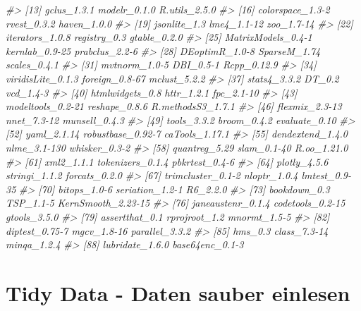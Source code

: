 \documentclass[12pt,]{book}
\newenvironment{Shaded}{\begin{snugshade}}{\end{snugshade}}
\newcommand{\CommentTok}[1]{\textcolor[rgb]{0.56,0.35,0.01}{\textit{{#1}}}}
\begin{document}
\begin{Shaded}
\begin{Highlighting}[]
\CommentTok{#> [13] gclus_1.3.1         modelr_0.1.0        R.utils_2.5.0      }
\CommentTok{#> [16] colorspace_1.3-2    rvest_0.3.2         haven_1.0.0        }
\CommentTok{#> [19] jsonlite_1.3        lme4_1.1-12         zoo_1.7-14         }
\CommentTok{#> [22] iterators_1.0.8     registry_0.3        gtable_0.2.0       }
\CommentTok{#> [25] MatrixModels_0.4-1  kernlab_0.9-25      prabclus_2.2-6     }
\CommentTok{#> [28] DEoptimR_1.0-8      SparseM_1.74        scales_0.4.1       }
\CommentTok{#> [31] mvtnorm_1.0-5       DBI_0.5-1           Rcpp_0.12.9        }
\CommentTok{#> [34] viridisLite_0.1.3   foreign_0.8-67      mclust_5.2.2       }
\CommentTok{#> [37] stats4_3.3.2        DT_0.2              vcd_1.4-3          }
\CommentTok{#> [40] htmlwidgets_0.8     httr_1.2.1          fpc_2.1-10         }
\CommentTok{#> [43] modeltools_0.2-21   reshape_0.8.6       R.methodsS3_1.7.1  }
\CommentTok{#> [46] flexmix_2.3-13      nnet_7.3-12         munsell_0.4.3      }
\CommentTok{#> [49] tools_3.3.2         broom_0.4.2         evaluate_0.10      }
\CommentTok{#> [52] yaml_2.1.14         robustbase_0.92-7   caTools_1.17.1     }
\CommentTok{#> [55] dendextend_1.4.0    nlme_3.1-130        whisker_0.3-2      }
\CommentTok{#> [58] quantreg_5.29       slam_0.1-40         R.oo_1.21.0        }
\CommentTok{#> [61] xml2_1.1.1          tokenizers_0.1.4    pbkrtest_0.4-6     }
\CommentTok{#> [64] plotly_4.5.6        stringi_1.1.2       forcats_0.2.0      }
\CommentTok{#> [67] trimcluster_0.1-2   nloptr_1.0.4        lmtest_0.9-35      }
\CommentTok{#> [70] bitops_1.0-6        seriation_1.2-1     R6_2.2.0           }
\CommentTok{#> [73] bookdown_0.3        TSP_1.1-5           KernSmooth_2.23-15 }
\CommentTok{#> [76] janeaustenr_0.1.4   codetools_0.2-15    gtools_3.5.0       }
\CommentTok{#> [79] assertthat_0.1      rprojroot_1.2       mnormt_1.5-5       }
\CommentTok{#> [82] diptest_0.75-7      mgcv_1.8-16         parallel_3.3.2     }
\CommentTok{#> [85] hms_0.3             class_7.3-14        minqa_1.2.4        }
\CommentTok{#> [88] lubridate_1.6.0     base64enc_0.1-3}
\end{Highlighting}
\end{Shaded}

\chapter{Tidy Data - Daten sauber
einlesen}\label{tidy-data---daten-sauber-einlesen}
\end{document}
